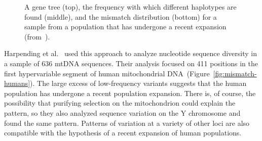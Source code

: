 \documentclass[12pt]{article}
\begin{document}
\begin{figure}
\begin{center}
\end{center}
\caption{A gene tree (top), the frequency with which different
  haplotypes are found (middle), and the mismatch distribution
  (bottom) for a sample from a population that has undergone a recent
  expansion
  (from~\cite{Harpending-etal-1998}).}\label{fig:mismatch-expansion}  
\end{figure}

Harpending et al.~\cite{Harpending-etal-1998} used this approach to
analyze nucleotide sequence diversity in a sample of 636 mtDNA
sequences. Their analysis focused on 411 positions in the first
hypervariable segment of human mitochondrial
DNA~(Figure~\ref{fig:mismatch-humans}). The large excess of
low-frequency variants suggests that the human population has
undergone a recent population expansion. There is, of course, the
possibility that purifying selection on the mitochondrion could
explain the pattern, so they also analyzed sequence variation on the Y
chromosome and found the same pattern. Patterns of variation at a
variety of other loci are also compatible with the hypothesis of a
recent expansion of human populations.
\end{document}
